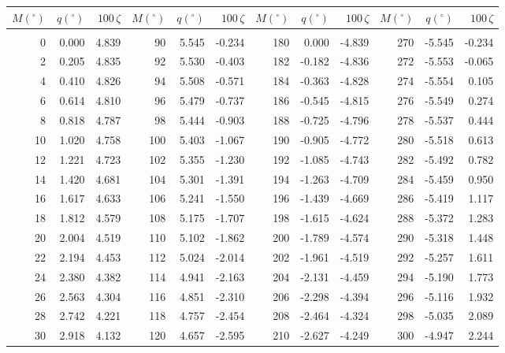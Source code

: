 \newpage
\begin{table}\centering
\small{ \begin{tabular}{rrr|rrr|rrr|rrr}
$M(^\circ)$ & $q(^\circ)$  & $100\,\zeta$ & $M(^\circ)$ & $q(^\circ)$  & $100\,\zeta$ & $M(^\circ)$ & $q(^\circ)$  & $100\,\zeta$& $M(^\circ)$ & $q(^\circ)$  & $100\,\zeta$\\\hline
&&&&&&&&&&&\\[-1.75ex]
  0 &   0.000 &  4.839 &  90 &   5.545 & -0.234 & 180 &   0.000 & -4.839 & 270 &  -5.545 & -0.234\\
  2 &   0.205 &  4.835 &  92 &   5.530 & -0.403 & 182 &  -0.182 & -4.836 & 272 &  -5.553 & -0.065\\
  4 &   0.410 &  4.826 &  94 &   5.508 & -0.571 & 184 &  -0.363 & -4.828 & 274 &  -5.554 &  0.105\\
  6 &   0.614 &  4.810 &  96 &   5.479 & -0.737 & 186 &  -0.545 & -4.815 & 276 &  -5.549 &  0.274\\
  8 &   0.818 &  4.787 &  98 &   5.444 & -0.903 & 188 &  -0.725 & -4.796 & 278 &  -5.537 &  0.444\\
 10 &   1.020 &  4.758 & 100 &   5.403 & -1.067 & 190 &  -0.905 & -4.772 & 280 &  -5.518 &  0.613\\
 12 &   1.221 &  4.723 & 102 &   5.355 & -1.230 & 192 &  -1.085 & -4.743 & 282 &  -5.492 &  0.782\\
 14 &   1.420 &  4.681 & 104 &   5.301 & -1.391 & 194 &  -1.263 & -4.709 & 284 &  -5.459 &  0.950\\
 16 &   1.617 &  4.633 & 106 &   5.241 & -1.550 & 196 &  -1.439 & -4.669 & 286 &  -5.419 &  1.117\\
 18 &   1.812 &  4.579 & 108 &   5.175 & -1.707 & 198 &  -1.615 & -4.624 & 288 &  -5.372 &  1.283\\
 20 &   2.004 &  4.519 & 110 &   5.102 & -1.862 & 200 &  -1.789 & -4.574 & 290 &  -5.318 &  1.448\\
 22 &   2.194 &  4.453 & 112 &   5.024 & -2.014 & 202 &  -1.961 & -4.519 & 292 &  -5.257 &  1.611\\
 24 &   2.380 &  4.382 & 114 &   4.941 & -2.163 & 204 &  -2.131 & -4.459 & 294 &  -5.190 &  1.773\\
 26 &   2.563 &  4.304 & 116 &   4.851 & -2.310 & 206 &  -2.298 & -4.394 & 296 &  -5.116 &  1.932\\
 28 &   2.742 &  4.221 & 118 &   4.757 & -2.454 & 208 &  -2.464 & -4.324 & 298 &  -5.035 &  2.089\\
 30 &   2.918 &  4.132 & 120 &   4.657 & -2.595 & 210 &  -2.627 & -4.249 & 300 &  -4.947 &  2.244\\

\end{tabular}}
\end{table}
